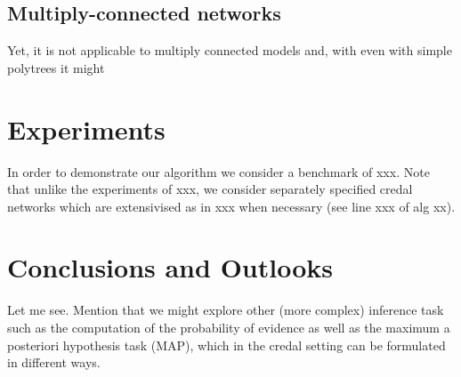 \documentclass[twoside,11pt]{article}
\begin{document}
\subsection{Multiply-connected networks}
Yet, it is not applicable to multiply connected models and, with even with simple polytrees it might
\section{Experiments}
In order to demonstrate our algorithm we consider a benchmark of xxx. Note that unlike the experiments of xxx, we consider separately specified credal networks which are extensivised as in xxx when necessary (see line xxx of alg xx).
\section{Conclusions and Outlooks}
Let me see. Mention that we might explore other (more complex) inference task such as the computation of the probability of evidence as well as the maximum a posteriori hypothesis task (MAP), which in the credal setting can be formulated in different ways.

\end{document}
